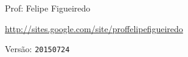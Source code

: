 \documentclass[a4paper]{article}
\begin{document}
\parbox[c]{.825\textwidth}{\raggedright%
{Prof: Felipe Figueiredo\par}
{\url{http://sites.google.com/site/proffelipefigueiredo}\par}
}

Versão: \verb|20150724|













\end{document}
